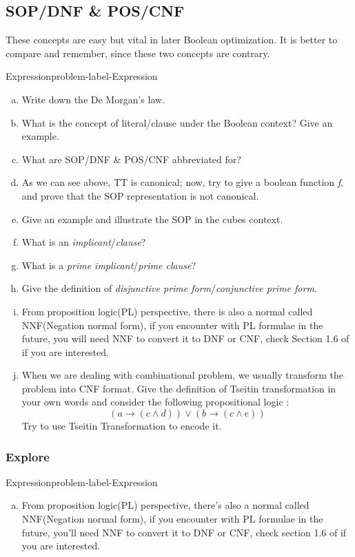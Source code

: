 \documentclass[main.tex]{subfiles}
\begin{document}
\subsection{SOP/DNF \& POS/CNF}
These concepts are easy but vital in later Boolean optimization. It is better to compare and remember, since these two concepts are contrary.
\begin{problem}{Expression}{problem-label-Expression}
\begin{enumerate}[(a)]
    \item Write down the De Morgan’s law.
    \item What is the concept of literal/clause under the Boolean context? Give an example.
    \item What are SOP/DNF \& POS/CNF abbreviated for?
    \item As we can see above, TT is canonical; now, try to give a boolean function \textit{f}, and prove that the SOP representation is not canonical.
    \item Give an example and illustrate the SOP in the cubes context.
    \item What is an \textit{implicant}/\textit{clause}?
    \item What is a \textit{prime implicant}/\textit{prime clause}?
    \item Give the definition of \textit{disjunctive prime form}/\textit{conjunctive prime form}.
    \item From proposition logic(PL) perspective, there is also a normal called NNF(Negation normal form), if you encounter with PL formulae in the future, you will need NNF to convert it to DNF or CNF, check Section 1.6 of \cite{CalculusOfComputation} if you are interested. 
    \item When we are dealing with combinational problem, we usually transform the problem into CNF format. Give the definition of Tseitin transformation in your own words and consider the following propositional logic \cite{HandbookOfSAT}:
    \[
    \left( a \rightarrow \left(c \wedge d \right)\right) \vee  \left( b \rightarrow \left(c \wedge e \right)\right)
    \]
    Try to use Tseitin Transformation to encode it.
\end{enumerate}
\end{problem}
\vspace*{4\baselineskip}

\subsubsection{Explore}
\begin{problem}{Expression}{problem-label-Expression}
\begin{enumerate}[(a)]
    \item From proposition logic(PL) perspective, there's also a normal called NNF(Negation normal form), if you encounter with PL formulae in the future, you'll need NNF to convert it to DNF or CNF, check section 1.6 of \cite{CalculusOfComputation} if you are interested. 
\end{enumerate}
\end{problem}
\end{document}
